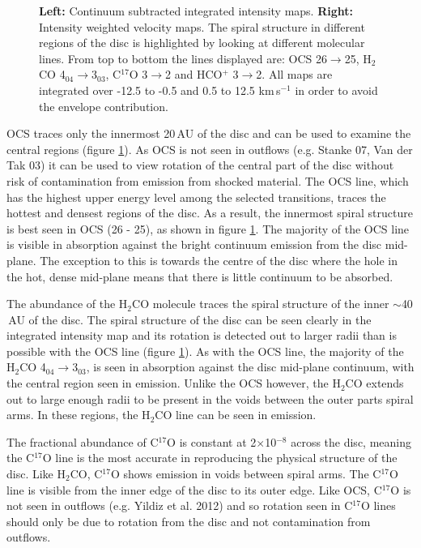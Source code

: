 \documentclass[useAMS,usenatbib]{mn2e}
\begin{document}
\begin{figure}
 \caption{{\bf Left:} Continuum subtracted integrated intensity maps. {\bf Right:} Intensity weighted velocity maps. The spiral structure in different regions of the disc is highlighted by looking at different molecular lines. From top to bottom the lines displayed are: OCS 26$\rightarrow$25, H$_2$CO 4$_{04}$$\rightarrow$3$_{03}$, C$^{17}$O 3$\rightarrow$2 and HCO$^+$ 3$\rightarrow$2. All maps are integrated over -12.5 to -0.5 and 0.5 to 12.5 km$\,$s$^{-1}$ in order to avoid the envelope contribution.}
 \label{sim_all}
\end{figure}


OCS traces only the innermost 20$\,$AU of the disc and can be used to examine the central regions (figure \ref{sim_all}). As OCS is not seen in outflows (e.g. Stanke 07, Van der Tak 03) it can be used to view rotation of the central part of the disc without risk of contamination from emission from shocked material. The OCS line, which has the highest upper energy level among the selected transitions, traces the hottest and densest regions of the disc. As a result, the innermost spiral structure is best seen in OCS (26 - 25), as shown in figure \ref{sim_all}. The majority of the OCS line is visible in absorption against the bright continuum emission from the disc mid-plane. The exception to this is towards the centre of the disc where the hole in the hot, dense mid-plane means that there is little continuum to be absorbed.\newline

The abundance of the H$_2$CO molecule traces the spiral structure of the inner $\sim$40$\,$AU of the disc. The spiral structure of the disc can be seen clearly in the integrated intensity map and its rotation is detected out to larger radii than is possible with the OCS line (figure \ref{sim_all}). As with the OCS line, the majority of the H$_2$CO 4$_{04}\rightarrow$3$_{03}$, is seen in absorption against the disc mid-plane continuum, with the central region seen in emission. Unlike the OCS however, the H$_2$CO extends out to large enough radii to be present in the voids between the outer parts spiral arms. In these regions, the H$_2$CO line can be seen in emission.\newline

The fractional abundance of C$^{17}$O is constant at 2$\times$10$^{-8}$ across the disc, meaning the C$^{17}$O line is the most accurate in reproducing the physical structure of the disc. Like H$_2$CO, C$^{17}$O shows emission in voids between spiral arms. The C$^{17}$O line is visible from the inner edge of the disc to its outer edge. Like OCS, C$^{17}$O is not seen in outflows (e.g. Yildiz et al. 2012) and so rotation seen in C$^{17}$O lines should only be due to rotation from the disc and not contamination from outflows.\newline
\end{document}
